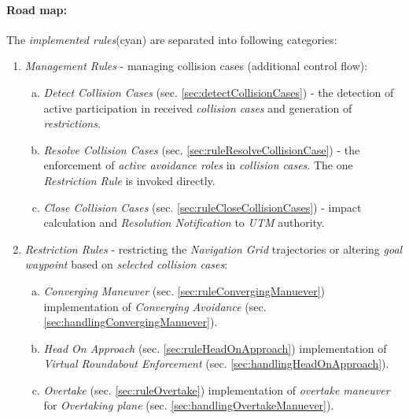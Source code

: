 \newpage
\paragraph{Road map:} The \emph{implemented rules}(cyan) are separated into following categories:
\begin{enumerate}
    \item \emph{Management Rules} - managing collision cases (additional control flow):
        \begin{enumerate}[a.]
            
            \item \emph{Detect Collision Cases} (sec. \ref{sec:detectCollisionCases}) - the detection of active participation in received \emph{collision cases} and generation of \emph{restrictions}.
            
            \item \emph{Resolve Collision Cases} (sec. \ref{sec:ruleResolveCollisionCase}) - the enforcement of \emph{active avoidance roles} in \emph{collision cases}. The one \emph{Restriction Rule} is invoked directly.
            
            \item \emph{Close Collision Cases} (sec. \ref{sec:ruleCloseCollisionCases}) - impact calculation and \emph{Resolution Notification} to \emph{UTM} authority.
        \end{enumerate}
    
    \item \emph{Restriction Rules} - restricting the \emph{Navigation Grid} trajectories or altering \emph{goal waypoint} based on \emph{selected collision cases}:
    \begin{enumerate}[a.]
        \item \emph{Converging Maneuver} (sec. \ref{sec:ruleConvergingManuever}) implementation of \emph{Converging Avoidance} (sec. \ref{sec:handlingConvergingManuever}).
        
        \item \emph{Head On Approach} (sec. \ref{sec:ruleHeadOnApproach}) implementation of \emph{Virtual Roundabout Enforcement} (sec. \ref{sec:handlingHeadOnApproach}).
        
        \item \emph{Overtake} (sec. \ref{sec:ruleOvertake}) implementation of \emph{overtake maneuver} for \emph{Overtaking plane} (sec. \ref{sec:handlingOvertakeManuever}).
    \end{enumerate}
    

\end{enumerate}
